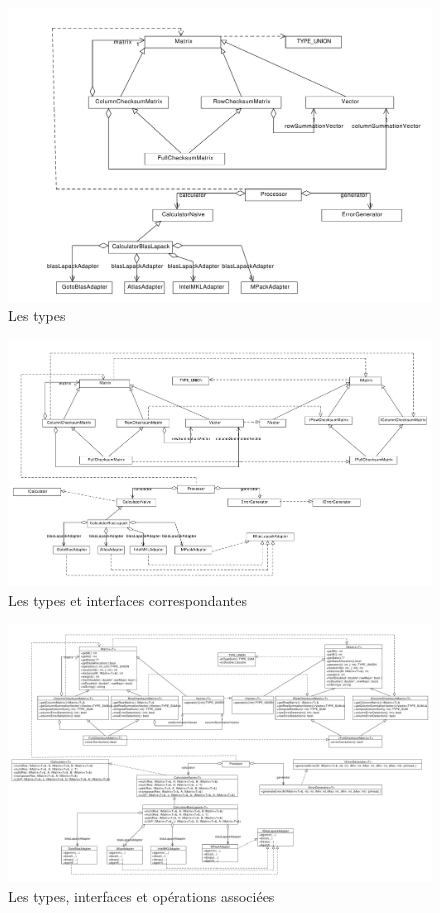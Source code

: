 \documentclass[a4paper, 10pt]{report}
\begin{document}
\begin{figure}[h]
\includegraphics[scale=0.4]{diag2.pdf}
\caption{Les types}
\end{figure}

\begin{figure}[h]
\includegraphics[scale=0.25]{diag3.pdf}
\caption{Les types et interfaces correspondantes}
\end{figure}

\begin{figure}[h]
\includegraphics[scale=0.2]{diag4.pdf}
\caption{Les types, interfaces et opérations associées}
\end{figure}
\end{document}
